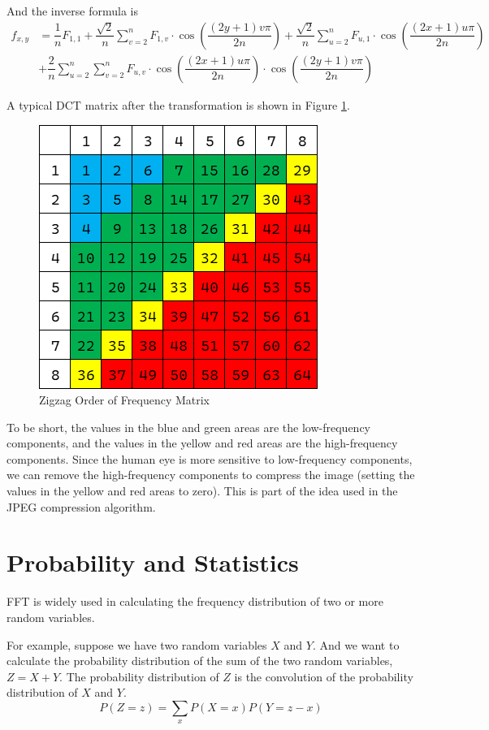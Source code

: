 \documentclass[a4paper,12pt]{article}
\begin{document}
And the inverse formula is
\begin{align*}
    f_{x, y}&=\dfrac1nF_{1, 1}+\dfrac{\sqrt2}n\sum\limits_{v=2}^nF_{1, v}\cdot\cos\left(\dfrac{(2y+1)v\pi}{2n}\right)+\dfrac{\sqrt2}n\sum\limits_{u=2}^nF_{u, 1}\cdot\cos\left(\dfrac{(2x+1)u\pi}{2n}\right)\\
    &+\dfrac2n\sum\limits_{u=2}^n\sum\limits_{v=2}^nF_{u, v}\cdot\cos\left(\dfrac{(2x+1)u\pi}{2n}\right)\cdot\cos\left(\dfrac{(2y+1)v\pi}{2n}\right)
\end{align*}

A typical DCT matrix after the transformation is shown in Figure \ref{fig:zigzag}.
\begin{figure}[H]
	\centering
	\includegraphics[width=0.5\linewidth]{./DCT.png}
	\caption{Zigzag Order of Frequency Matrix}
	\label{fig:zigzag}	
\end{figure}

To be short, the values in the blue and green areas are the low-frequency components, and the values in the yellow and red areas are the high-frequency components.
Since the human eye is more sensitive to low-frequency components, we can remove the high-frequency components to compress the image (setting the values in the yellow and red areas to zero).
This is part of the idea used in the JPEG compression algorithm.

\section{Probability and Statistics}

FFT is widely used in calculating the frequency distribution of two or more random variables.

For example, suppose we have two random variables $X$ and $Y$.
And we want to calculate the probability distribution of the sum of the two random variables, $Z = X + Y$.
The probability distribution of $Z$ is the convolution of the probability distribution of $X$ and $Y$.
\begin{equation*}
	P(Z = z) = \sum_{x} P(X = x)P(Y = z - x)
\end{equation*}
\end{document}
